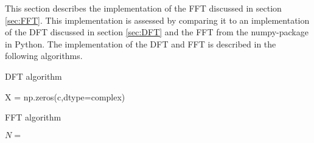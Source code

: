This section describes the implementation of the FFT discussed in section \ref{sec:FFT}. This implementation is assessed by comparing it to an implementation of the DFT discussed in section \ref{sec:DFT} and the FFT from the numpy-package in Python. The implementation of the DFT and FFT is described in the following algorithms.

\begin{algorithm}
\caption{DFT algorithm}
\label{DFTalg}
\begin{algorithmic}[1]
X = np.zeros(c,dtype=complex)
\EndProcedure
\end{algorithmic}
\end{algorithm}

\begin{algorithm}
\caption{FFT algorithm}
\label{FFTalg}
\begin{algorithmic}[1]
\State $N = $ 
\end{algorithmic}
\end{algorithm}